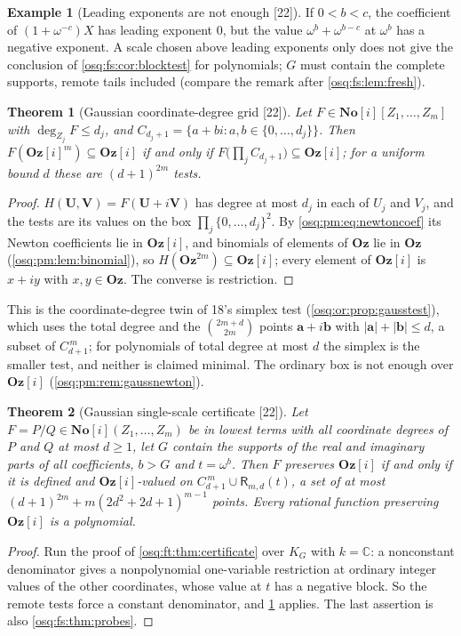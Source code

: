 \documentclass[11pt,letterpaper]{article}
\numberwithin{equation}{section}
\newtheorem{theorem}{Theorem}[section]
\theoremstyle{definition}
\newtheorem{example}[example]{Example}
\theoremstyle{remark}
\theoremstyle{plain}
\newcommand{\No}{\mathbf{No}}
\newcommand{\Oz}{\mathbf{Oz}}
\newcommand{\SC}{\No[i]}
\newcommand{\GOz}{\Oz[i]}
\newcommand{\C}{\mathbb C}
\newcommand{\src}[1]{\textup{\textsf{[#1]}}}
\begin{document}
\begin{example}[Leading exponents are not enough \src{22}]\label{osq:ft:ex:leading}
If $0<b<c$, the coefficient of $(1+\omega^{-c})X$ has leading exponent $0$, but the value $\omega^b+\omega^{b-c}$ at $\omega^b$ has a negative
exponent. A scale chosen above leading exponents only does not give the conclusion of \cref{osq:fs:cor:blocktest} for polynomials; $G$ must contain the
complete supports, remote tails included (compare the remark after \cref{osq:fs:lem:fresh}).
\end{example}

\begin{theorem}[Gaussian coordinate-degree grid \src{22}]\label{osq:ft:thm:gausspoly}
Let $F\in\SC[Z_1,\dots,Z_m]$ with $\deg_{Z_j}F\le d_j$, and $C_{d_j+1}=\{a+bi:a,b\in\{0,\dots,d_j\}\}$. Then $F(\GOz^m)\subseteq\GOz$ if and only if
$F\bigl(\prod_jC_{d_j+1}\bigr)\subseteq\GOz$; for a uniform bound $d$ these are $(d+1)^{2m}$ tests.
\end{theorem}
\begin{proof}
$H(\mathbf U,\mathbf V)=F(\mathbf U+i\mathbf V)$ has degree at most $d_j$ in each of $U_j$ and $V_j$, and the tests are its values on the box
$\prod_j\{0,\dots,d_j\}^2$. By \eqref{osq:pm:eq:newtoncoef} its Newton coefficients lie in $\GOz$, and binomials of elements of $\Oz$ lie in $\Oz$
(\cref{osq:pm:lem:binomial}), so $H(\Oz^{2m})\subseteq\GOz$; every element of $\GOz$ is $x+iy$ with $x,y\in\Oz$. The converse is restriction.
\end{proof}

This is the coordinate-degree twin of 18's simplex test (\cref{osq:or:prop:gausstest}), which uses the total degree and the $\binom{2m+d}{2m}$ points
$\mathbf a+i\mathbf b$ with $|\mathbf a|+|\mathbf b|\le d$, a subset of $C_{d+1}^{\,m}$; for polynomials of total degree at most $d$ the simplex is the
smaller test, and neither is claimed minimal. The ordinary box is not enough over $\GOz$ (\cref{osq:pm:rem:gaussnewton}).

\begin{theorem}[Gaussian single-scale certificate \src{22}]\label{osq:ft:thm:gaussrational}
Let $F=P/Q\in\SC(Z_1,\dots,Z_m)$ be in lowest terms with all coordinate degrees of $P$ and $Q$ at most $d\ge1$, let $G$ contain the supports of the real
and imaginary parts of all coefficients, $b>G$ and $t=\omega^b$. Then $F$ preserves $\GOz$ if and only if it is defined and $\GOz$-valued on
$C_{d+1}^{\,m}\cup\mathsf R_{m,d}(t)$, a set of at most $(d+1)^{2m}+m(2d^2+2d+1)^{m-1}$ points. Every rational function preserving $\GOz$ is a
polynomial.
\end{theorem}
\begin{proof}
Run the proof of \cref{osq:ft:thm:certificate} over $K_G$ with $k=\C$: a nonconstant denominator gives a nonpolynomial one-variable restriction at
ordinary integer values of the other coordinates, whose value at $t$ has a negative block. So the remote tests force a constant denominator, and
\cref{osq:ft:thm:gausspoly} applies. The last assertion is also \cref{osq:fs:thm:probes}.
\end{proof}
\end{document}
